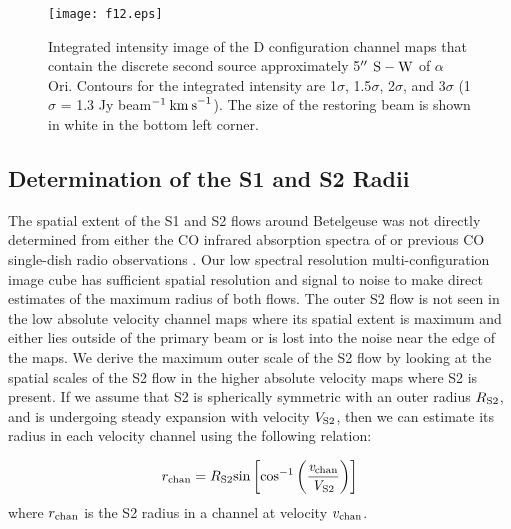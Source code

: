 \documentclass[iop]{emulateapj}
\begin{document}
\begin{figure}
\texttt{[image: f12.eps]}
\caption{Integrated intensity image of the D configuration channel maps that contain the discrete second source approximately 5$\mbox{$^{\prime\prime}$}$ $\rm{S-W}$ of $\alpha$ Ori. Contours for the integrated intensity are 1$\sigma$, 1.5$\sigma$, 2$\sigma$, and 3$\sigma$ (1$\sigma$ = 1.3 Jy beam${}^{-1}\>{\rm km\>s}^{-1}$). The size of the restoring beam is shown in white in the bottom left corner.}
\label{fig:fig4}
\end{figure}

\subsection{Determination of the S1 and S2 Radii} \label{results3} 
The spatial extent of the S1 and S2 flows around Betelgeuse was not directly determined from either the CO infrared absorption spectra of \cite{1979ApJ...233L.135B} or previous CO single-dish radio observations \citep{1980ApJ...242L..25K, 1987ApJ...313..400H, 1994ApJ...424L.127H}. Our low spectral resolution multi-configuration image cube has sufficient spatial resolution and signal to noise to make direct estimates of the maximum radius of both flows. The outer S2 flow is not seen in the low absolute velocity channel maps where its spatial extent is maximum and either lies outside of the primary beam or is lost into the noise near the edge of the maps. We derive the maximum outer scale of the S2 flow by looking at the spatial scales of the S2 flow in the higher absolute velocity maps where S2 is present. If we assume that S2 is spherically symmetric with an outer radius $R_{\rm{S2}}$, and is undergoing steady expansion with velocity $V_{\rm{S2}}$, then we can estimate its radius in each velocity channel using the following relation:

\begin{equation}
r_{\rm{chan}}=R_{\rm{S2}} \rm{sin}\left[\rm{cos}^{-1}\left(\frac{\textit{v}_{chan}}{\textit{V}_{S2}}\right) \right]
\end{equation} 
where ${r_{\rm{chan}}}$ is the S2 radius in a channel at velocity $v_{\rm{chan}}$. 
\end{document}
